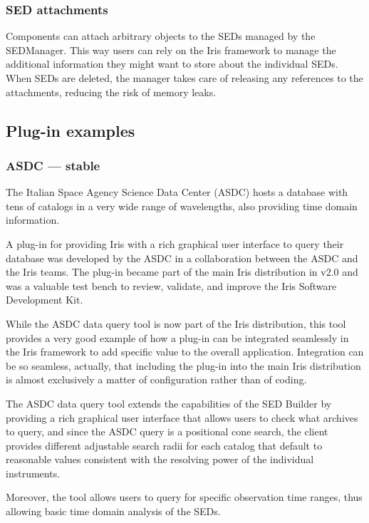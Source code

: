 \documentclass[preprint,authoryear,5p]{elsarticle}
\begin{document}
\subsubsection{SED attachments} Components can attach arbitrary objects to the
SEDs managed by the SEDManager. This way users can rely on the Iris framework to
manage the additional information they might want to store about the individual
SEDs. When SEDs are deleted, the manager takes care of releasing any references
to the attachments, reducing the risk of memory leaks.



\subsection{Plug-in examples} \subsubsection{ASDC --- stable} The Italian Space
Agency Science Data Center (ASDC) hosts a database with tens of catalogs in a
very wide range of wavelengths, also providing time domain information.

A plug-in for providing Iris with a rich graphical user interface to query their
database was developed by the ASDC in a collaboration between the ASDC and the
Iris teams. The plug-in became part of the main Iris distribution in v2.0 and
was a valuable test bench to review, validate, and improve the Iris
Software Development Kit.

While the ASDC data query tool is now part of the Iris distribution, this tool
provides a very good example of how a plug-in can be integrated seamlessly in
the Iris framework to add specific value to the overall application.
Integration can be so seamless,
actually, that including the plug-in into the main Iris distribution is almost
exclusively a matter of configuration rather than of coding.

The ASDC data query tool extends the capabilities of the SED Builder by
providing a rich graphical user interface that allows users to check what
archives to query, and since the ASDC query is a positional cone search, the
client provides different adjustable search radii for each catalog that default
to reasonable values consistent with the resolving power of the individual
instruments.

Moreover, the tool allows users to query for specific observation time ranges, thus
allowing basic time domain analysis of the SEDs.
\end{document}
